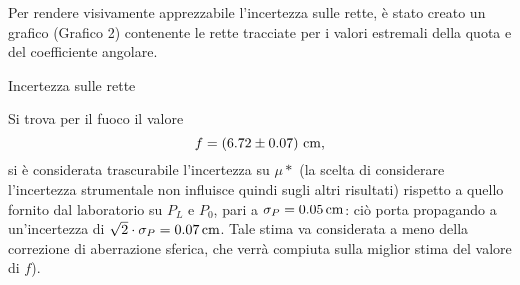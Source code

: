 Per rendere visivamente apprezzabile l'incertezza sulle rette, \`e stato creato un grafico (Grafico 2) contenente le rette tracciate per i valori estremali della quota e del coefficiente angolare.
\begin{grafico} \centering  \caption{Incertezza sulle rette} \label{gr:01_graph_2.tex} \end{grafico}

Si trova per il fuoco il valore 
\[ f=\left(6.72 \pm 0.07\right) \,\mathrm{cm} , \] 
si \`e considerata trascurabile l'incertezza su $\mu*$ (la scelta di considerare l'incertezza strumentale non influisce quindi sugli altri risultati) rispetto a quello fornito dal laboratorio su $P_L$ e $P_0$, pari a $\sigma _P = 0.05 \,\mathrm{cm}$: ci\`o porta propagando a un'incertezza di $\sqrt{2} \cdot \sigma_P = 0.07 \,\mathrm{cm}$. Tale stima va considerata a meno della correzione di aberrazione sferica, che verr\`a compiuta sulla miglior stima del valore di $f$).

